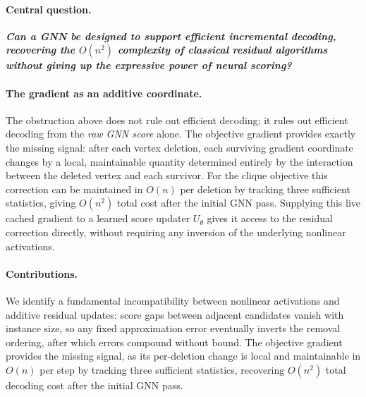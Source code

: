 \documentclass[11pt]{article}
\theoremstyle{plain}
\theoremstyle{remark}
\theoremstyle{plain}
\begin{document}
\paragraph{Central question.}
\textbf{\emph{Can a GNN be designed to support efficient incremental decoding,
    recovering the $O(n^2)$ complexity of classical residual algorithms without giving up
the expressive power of neural scoring?}}

\paragraph{The gradient as an additive coordinate.}
The obstruction above does not rule out efficient decoding; it rules out efficient
decoding from the \emph{raw GNN score} alone. The objective gradient provides exactly
the missing signal: after each vertex deletion, each surviving gradient coordinate
changes by a local, maintainable quantity determined entirely by the interaction
between the deleted vertex and each survivor. For the clique objective this correction
can be maintained in $O(n)$ per deletion by tracking three sufficient statistics,
giving $O(n^2)$ total cost after the initial GNN pass. Supplying this live cached
gradient to a learned score updater $U_\theta$ gives it access to the residual
correction directly, without requiring any inversion of the underlying nonlinear
activations.

\paragraph{Contributions.}
We identify a fundamental incompatibility between nonlinear activations and additive
residual updates: score gaps between adjacent candidates vanish with instance size,
so any fixed approximation error eventually inverts the removal ordering, after which
errors compound without bound. The objective gradient provides the missing signal,
as its per-deletion change is local and maintainable in $O(n)$ per step by tracking
three sufficient statistics, recovering $O(n^2)$ total decoding cost after the
initial GNN pass.
\end{document}
